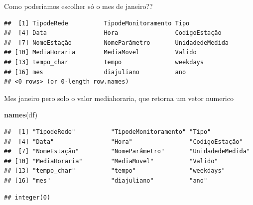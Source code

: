 \documentclass[]{book}
\newenvironment{Shaded}{\begin{snugshade}}{\end{snugshade}}
\newcommand{\KeywordTok}[1]{\textcolor[rgb]{0.13,0.29,0.53}{\textbf{#1}}}
\newcommand{\DecValTok}[1]{\textcolor[rgb]{0.00,0.00,0.81}{#1}}
\newcommand{\StringTok}[1]{\textcolor[rgb]{0.31,0.60,0.02}{#1}}
\newcommand{\CommentTok}[1]{\textcolor[rgb]{0.56,0.35,0.01}{\textit{#1}}}
\newcommand{\OperatorTok}[1]{\textcolor[rgb]{0.81,0.36,0.00}{\textbf{#1}}}
\newcommand{\NormalTok}[1]{#1}
\begin{document}
Como poderiamos escolher só o mes de janeiro??

\begin{Shaded}
\end{Shaded}

\begin{verbatim}
##  [1] TipodeRede          TipodeMonitoramento Tipo               
##  [4] Data                Hora                CodigoEstação      
##  [7] NomeEstação         NomeParâmetro       UnidadedeMedida    
## [10] MediaHoraria        MediaMovel          Valido             
## [13] tempo_char          tempo               weekdays           
## [16] mes                 diajuliano          ano                
## <0 rows> (or 0-length row.names)
\end{verbatim}

Mes janeiro pero solo o valor mediahoraria, que retorna um vetor
numerico

\begin{Shaded}
\begin{Highlighting}[]
\KeywordTok{names}\NormalTok{(df)}
\end{Highlighting}
\end{Shaded}

\begin{verbatim}
##  [1] "TipodeRede"          "TipodeMonitoramento" "Tipo"               
##  [4] "Data"                "Hora"                "CodigoEstação"      
##  [7] "NomeEstação"         "NomeParâmetro"       "UnidadedeMedida"    
## [10] "MediaHoraria"        "MediaMovel"          "Valido"             
## [13] "tempo_char"          "tempo"               "weekdays"           
## [16] "mes"                 "diajuliano"          "ano"
\end{verbatim}

\begin{Shaded}
\end{Shaded}

\begin{verbatim}
## integer(0)
\end{verbatim}
\end{document}
